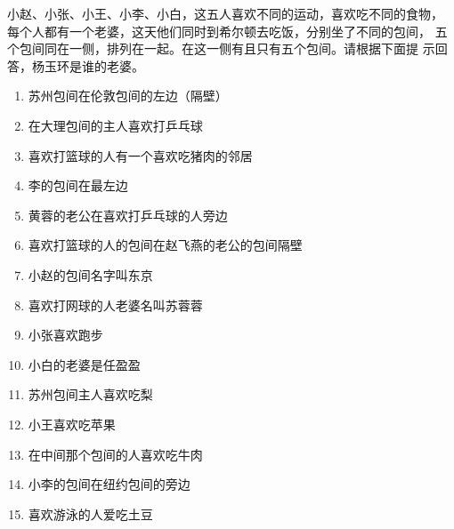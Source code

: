 \begin{question}
  小赵、小张、小王、小李、小白，这五人喜欢不同的运动，喜欢吃不同的食物，
  每个人都有一个老婆，这天他们同时到希尔顿去吃饭，分别坐了不同的包间，
  五个包间同在一侧，排列在一起。在这一侧有且只有五个包间。请根据下面提
  示回答，杨玉环是谁的老婆。

  \begin{enumerate}
  \item 苏州包间在伦敦包间的左边（隔壁）
  \item 在大理包间的主人喜欢打乒乓球
  \item 喜欢打篮球的人有一个喜欢吃猪肉的邻居
  \item 李的包间在最左边
  \item 黄蓉的老公在喜欢打乒乓球的人旁边
  \item 喜欢打篮球的人的包间在赵飞燕的老公的包间隔壁
  \item 小赵的包间名字叫东京
  \item 喜欢打网球的人老婆名叫苏蓉蓉
  \item 小张喜欢跑步
  \item 小白的老婆是任盈盈
  \item 苏州包间主人喜欢吃梨
  \item 小王喜欢吃苹果
  \item 在中间那个包间的人喜欢吃牛肉
  \item 小李的包间在纽约包间的旁边
  \item 喜欢游泳的人爱吃土豆
  \end{enumerate}
\end{question}

